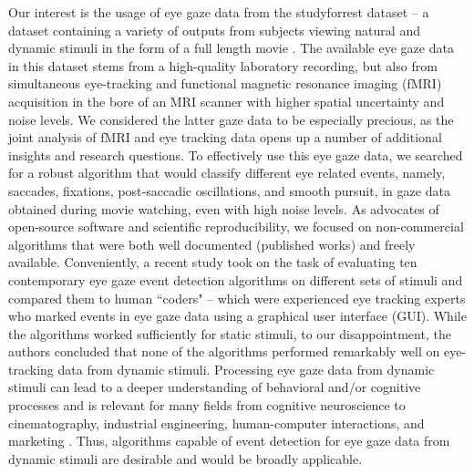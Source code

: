 Our interest is the usage of eye gaze data from the studyforrest dataset -- a dataset containing a variety of outputs from subjects viewing natural and dynamic stimuli in the form of a full length movie \citep{Hanke2016}. The available eye gaze data in this dataset stems from a high-quality laboratory recording, but also from simultaneous eye-tracking and functional magnetic resonance imaging (fMRI) acquisition in the bore of an MRI scanner with higher spatial uncertainty and noise levels. We considered the latter gaze data to be especially precious, as the joint analysis of fMRI and eye tracking data opens up a number of additional insights and research questions.  To effectively use this eye gaze data, we searched for a robust algorithm that would classify different eye related events, namely, saccades, fixations, post-saccadic oscillations, and smooth pursuit, in gaze data obtained during movie watching, even with high noise levels. As advocates of open-source software and scientific reproducibility, we focused on non-commercial algorithms that were both well documented (published works) and freely available. Conveniently, a recent study \citep{Andersson2017} took on the task of evaluating ten contemporary eye gaze event detection algorithms on different sets of stimuli and compared them to human ``coders" -- which were experienced eye tracking experts who marked events in eye gaze data using a graphical user interface (GUI). While the algorithms worked sufficiently for static stimuli, to our disappointment, the authors concluded that none of the algorithms performed remarkably well on eye-tracking data from dynamic stimuli. Processing eye gaze data from dynamic stimuli can lead to a deeper understanding of behavioral and/or cognitive processes and is relevant for many fields from cognitive neuroscience to cinematography, industrial engineering, human-computer interactions, and marketing \citep{Duchowski2002}. Thus, algorithms capable of event detection for eye gaze data from dynamic stimuli are desirable and would be broadly applicable. \\



